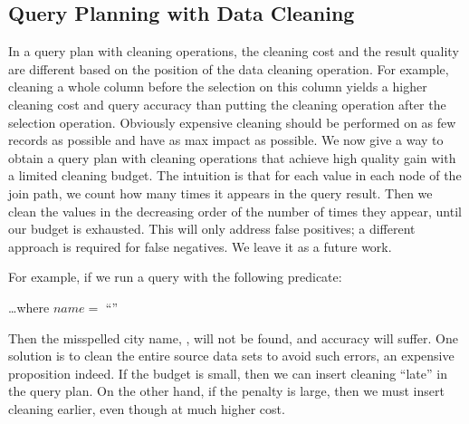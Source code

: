 



\subsection{Query Planning with Data Cleaning}
\label{subsec:gain}


In a query plan with cleaning operations, the cleaning cost and the result quality are different based on the position of the data cleaning operation. For example, cleaning a whole column before the selection on this column yields a higher cleaning cost and query accuracy than putting the cleaning operation after the selection operation. Obviously expensive cleaning should be performed on as few records as possible and have as max impact as possible. We now give a way to obtain a query plan with cleaning operations that achieve high quality gain with a limited cleaning budget.
The intuition is that for each value in each node of the join path, we count how many times it appears in the query result. Then we clean the values in the decreasing order of the number of times they appear, until our budget is exhausted. This will only address false positives; a different approach is required for false negatives. We leave it as a future work.








\iffalse
For example, if we run a query with the following predicate:

\vspace{.5em}
\dots \textsf{where} $name = $ ``''
\vspace{.5em}



\noindent Then the misspelled city name,  \ie {}, will not be found, and accuracy will suffer. One solution is to clean the entire source data sets to avoid such errors, an expensive proposition indeed. If the budget is small, then we can insert cleaning ``late'' in the query plan. On the other hand, if the penalty is large, then we must insert cleaning earlier, even though at much higher cost. 

